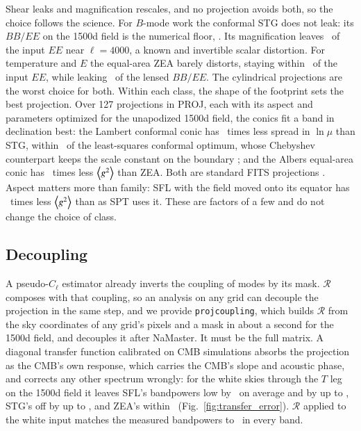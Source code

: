 \documentclass{aa}
\newcommand{\gsq}{\expval{g^2}}
\begin{document}
Shear leaks and magnification rescales, and no projection avoids both, so the choice follows the science.
For $B$-mode work the conformal STG does not leak: its $BB/EE$ on the 1500d field is the numerical floor, \floorField.
Its magnification leaves \EEboxSTGfourK\ of the input $EE$ near $\ell = 4000$, a known and invertible scalar distortion.
For temperature and $E$ the equal-area ZEA barely distorts, staying within \EEboxZEAdev\ of the input $EE$, while leaking \ZEAoverlens\ of the lensed $BB/EE$.
The cylindrical projections are the worst choice for both.
Within each class, the shape of the footprint sets the best projection.
Over 127 projections in PROJ, each with its aspect and parameters optimized for the unapodized 1500d field, the conics fit a band in declination best: the Lambert conformal conic has \surveyLCCoverSTG\ times less spread in $\ln\mu$ than STG, within \surveyLCCoverOpt\ of the least-squares conformal optimum, whose Chebyshev counterpart keeps the scale constant on the boundary \citep{milnor69}; and the Albers equal-area conic has \surveyZEAoverAEA\ times less $\gsq$ than ZEA.
Both are standard FITS projections \citep{calabretta02}.
Aspect matters more than family: SFL with the field moved onto its equator has \surveySFLrecentre\ times less $\gsq$ than as SPT uses it.
These are factors of a few and do not change the choice of class.

\subsection{Decoupling} \label{subsec:correct}

A pseudo-$C_\ell$ estimator already inverts the coupling of modes by its mask.
$\mathcal{R}$ composes with that coupling, so an analysis on any grid can decouple the projection in the same step, and we provide \texttt{projcoupling}, which builds $\mathcal{R}$ from the sky coordinates of any grid's pixels and a mask in about a second for the 1500d field, and decouples it after NaMaster.
It must be the full matrix.
A diagonal transfer function calibrated on CMB simulations absorbs the projection as the CMB's own response, which carries the CMB's slope and acoustic phase, and corrects any other spectrum wrongly: for the white skies through the $T$ leg on the 1500d field it leaves SFL's bandpowers low by \tfSFLmean\ on average and by up to \tfSFLworst, STG's off by up to \tfSTGworst, and ZEA's within \tfZEAworst\ (Fig.~\ref{fig:transfer_error}).
$\mathcal{R}$ applied to the white input matches the measured bandpowers to \tfclosureworst\ in every band.
\end{document}
